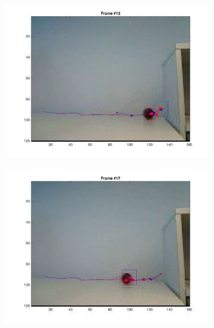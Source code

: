 \documentclass{ethz_report}
\begin{document}
\begin{figure}[h]
\begin{subfigure}[b]{.25\textwidth}
    \end{subfigure}%
    \begin{subfigure}[b]{.25\textwidth}
        \centering
        \includegraphics[width=1\linewidth]{images/video3_bins_high_11}
    \end{subfigure}%
    \begin{subfigure}[b]{.25\textwidth}
        \centering
        \includegraphics[width=1\linewidth]{images/video3_bins_high_16}
    \end{subfigure}
    \begin{subfigure}[b]{.25\textwidth}
        \centering

\end{subfigure}
\end{figure}
\end{document}
